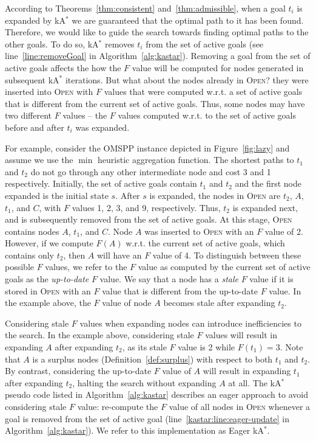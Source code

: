 \documentclass[smallextended]{svjour3}       %
\newcommand{\omspp}{\ac{OMSPP}\xspace}
\newcommand{\kastar}{kA$^*$\xspace}
\newcommand{\open}{\textsc{Open}\xspace}
\begin{document}
According to Theorems~\ref{thm:consistent} and~\ref{thm:admissible}, when a goal $t_i$ is expanded by \kastar we are guaranteed that the optimal path to it has been found. Therefore, we would like to guide the search towards finding optimal paths to the other goals. 
To do so, \kastar removes $t_i$ from the set of active goals (see line~\ref{line:removeGoal} in Algorithm~\ref{alg:kastar}). Removing a goal from the set of active goals affects the how the $F$ value will be computed for nodes generated in subsequent \kastar iterations. But what about the nodes already in \open? they were inserted into \open with $F$ values that were computed w.r.t. a set of active goals that is different from the current set of active goals. 
Thus, some nodes may have two different $F$ values -- the $F$ values computed w.r.t. to the set of active goals before and after $t_i$ was expanded. 


For example, consider the \omspp instance depicted in Figure~\ref{fig:lazy} and assume we use the $\min$ heuristic aggregation function. 
The shortest paths to $t_1$ and $t_2$ do not go through any other intermediate node and cost 3 and 1 respectively. 
Initially, the set of active goals contain $t_1$ and $t_2$ 
and the first node expanded is the initial state $s$. 
After $s$ is expanded, the nodes in \open are $t_2$, $A$, $t_1$, and $C$, 
with $F$ values 1, 2, 3, and 9, respectively. Thus, $t_2$ is expanded next, and is subsequently removed from the set of active goals. 
At this stage, \open contains nodes $A$, $t_1$, and $C$. 
Node $A$ was inserted to \open with an $F$ value of 2. 
However, if we compute $F(A)$ w.r.t. the current set of active goals, which contains only $t_2$, then $A$ will have an $F$ value of 4. 
To distinguish between these possible $F$ values, we refer to the $F$ value as computed by the current set of active goals as the \emph{up-to-date} $F$ value. 
We say that a node has a \emph{stale} $F$ value if it is stored in \open with an $F$ value that is different from the up-to-date $F$ value. 
In the example above, the $F$ value of node $A$ becomes stale after expanding $t_2$. 


Considering stale $F$ values when expanding nodes can introduce inefficiencies to the search. In the example above, considering stale $F$ values will result in expanding $A$ after expanding $t_2$, as its stale $F$ value is 2 while $F(t_1)=3$. Note that $A$ is a surplus nodes (Definition~\ref{def:surplus}) with respect to both $t_1$ and $t_2$. By contrast, considering the up-to-date $F$ value of $A$ will result in expanding $t_1$ after expanding $t_2$, halting the search without expanding $A$ at all. %
The \kastar pseudo code listed in Algorithm~\ref{alg:kastar}
describes an eager approach to avoid considering stale $F$ value: re-compute the $F$ value of all nodes in \open whenever a goal is removed from the set of active goal (line~\ref{kastar:line:eager-update} in Algorithm~\ref{alg:kastar}). We refer to this implementation as Eager \kastar. 
\end{document}
